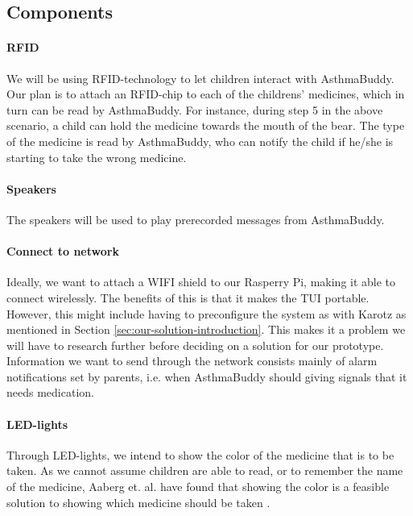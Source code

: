 \subsection{Components}

\paragraph{RFID}
We will be using RFID-technology to let children interact with AsthmaBuddy. Our plan is to attach an RFID-chip to each of the childrens' medicines, which in turn can be read by AsthmaBuddy. For instance, during step 5 in the above scenario, a child can hold the medicine towards the mouth of the bear. The type of the medicine is read by AsthmaBuddy, who can notify the child if he/she is starting to take the wrong medicine. 

\paragraph{Speakers}
The speakers will be used to play prerecorded messages from AsthmaBuddy.

\paragraph{Connect to network}
Ideally, we want to attach a WIFI shield to our Rasperry Pi, making it able to connect wirelessly. The benefits of this is that it makes the TUI portable. However, this might include having to preconfigure the system as with Karotz as mentioned in Section \ref{sec:our-solution-introduction}. This makes it a problem we will have to research further before deciding on a solution for our prototype. Information we want to send through the network consists mainly of alarm notifications set by parents, i.e. when AsthmaBuddy should giving signals that it needs medication. 

\paragraph{LED-lights}
Through LED-lights, we intend to show the color of the medicine that is to be taken. As we cannot assume children are able to read, or to remember the name of the medicine, Aaberg et. al. have found that showing the color is a feasible solution to showing which medicine should be taken \cite{CustomerDriven}. 

